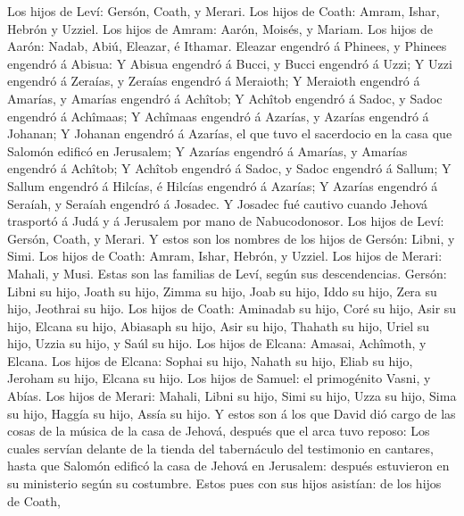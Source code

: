  Los hijos de Leví: Gersón, Coath, y Merari. 
Los hijos de Coath: Amram, Ishar, Hebrón y Uzziel.  Los
hijos de Amram: Aarón, Moisés, y Mariam. Los hijos de Aarón: Nadab,
Abiú, Eleazar, é Ithamar.  Eleazar engendró á Phinees, y
Phinees engendró á Abisua:  Y Abisua engendró á Bucci, y
Bucci engendró á Uzzi;  Y Uzzi engendró á Zeraías, y Zeraías
engendró á Meraioth;  Y Meraioth engendró á Amarías, y
Amarías engendró á Achîtob;  Y Achîtob engendró á Sadoc, y
Sadoc engendró á Achîmaas;  Y Achîmaas engendró á Azarías, y
Azarías engendró á Johanan;  Y Johanan engendró á Azarías,
el que tuvo el sacerdocio en la casa que Salomón edificó en Jerusalem;
 Y Azarías engendró á Amarías, y Amarías engendró á
Achîtob;  Y Achîtob engendró á Sadoc, y Sadoc engendró á
Sallum;  Y Sallum engendró á Hilcías, é Hilcías engendró á
Azarías;  Y Azarías engendró á Seraíah, y Seraíah engendró
á Josadec.  Y Josadec fué cautivo cuando Jehová trasportó á
Judá y á Jerusalem por mano de Nabucodonosor.  Los hijos de
Leví: Gersón, Coath, y Merari.  Y estos son los nombres de
los hijos de Gersón: Libni, y Simi.  Los hijos de Coath:
Amram, Ishar, Hebrón, y Uzziel.  Los hijos de Merari:
Mahali, y Musi. Estas son las familias de Leví, según sus descendencias.
 Gersón: Libni su hijo, Joath su hijo, Zimma su hijo,
 Joab su hijo, Iddo su hijo, Zera su hijo, Jeothrai su
hijo.  Los hijos de Coath: Aminadab su hijo, Coré su hijo,
Asir su hijo,  Elcana su hijo, Abiasaph su hijo, Asir su
hijo,  Thahath su hijo, Uriel su hijo, Uzzia su hijo, y
Saúl su hijo.  Los hijos de Elcana: Amasai, Achîmoth, y
Elcana.  Los hijos de Elcana: Sophai su hijo, Nahath su
hijo,  Eliab su hijo, Jeroham su hijo, Elcana su hijo.
 Los hijos de Samuel: el primogénito Vasni, y Abías.
 Los hijos de Merari: Mahali, Libni su hijo, Simi su hijo,
Uzza su hijo,  Sima su hijo, Haggía su hijo, Assía su hijo.
 Y estos son á los que David dió cargo de las cosas de la
música de la casa de Jehová, después que el arca tuvo reposo:
 Los cuales servían delante de la tienda del tabernáculo
del testimonio en cantares, hasta que Salomón edificó la casa de Jehová
en Jerusalem: después estuvieron en su ministerio según su costumbre.
 Estos pues con sus hijos asistían: de los hijos de Coath,
